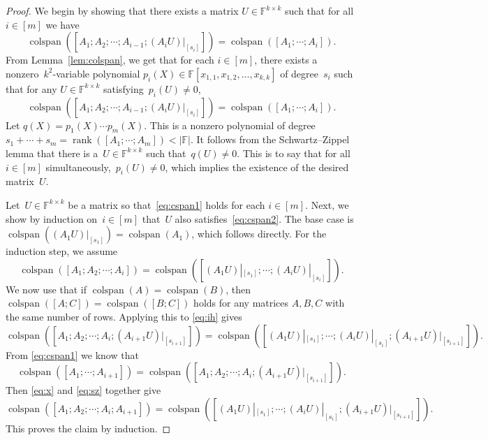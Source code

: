 \documentclass{daj}
\newcommand{\FF}{\mathbb{F}}
\DeclareMathOperator{\rank}{rank} \DeclareMathOperator{\col}{colspan}
\begin{document}
\begin{proof}
We begin by showing that there exists a matrix $U \in \FF^{k \times k}$ such that for all $i \in [m]$ we have 
\begin{equation}\label{eq:cspan1}
    \col([A_1 ; A_2 ; \cdots ; A_{i-1} ; (A_i U)|_{[s_i]}]) = \col([A_1; \cdots ; A_i]).
\end{equation}
From Lemma~\ref{lem:colspan}, we get that for each $i\in [m]$, there exists a nonzero~$k^2$-variable polynomial $p_i(X)\in \FF[x_{1,1},x_{1,2},\dots,x_{k,k}]$ of degree~$s_i$ such that for any $U\in \FF^{k\times k}$ satisfying~$p_i(U)\ne 0$,
\[
    \col([A_1 ; A_2 ; \cdots ; A_{i-1} ; (A_i U)|_{[s_i]}]) = \col([A_1; \cdots ; A_i]).
    \]
Let $q(X)=  p_1(X)\cdots p_m(X)$.
This is a nonzero polynomial of degree $s_1 + \cdots +s_m = \rank([A_1; \cdots; A_m])<|\FF|$.
It follows from the Schwartz--Zippel lemma \cite{DEMILLO1978193, schwartz1980fast, zippel1979probabilistic} that there is a~$U\in \FF^{k\times k}$ such that~$q(U) \ne 0$.
This is to say that for all~$i\in[m]$ simultaneously,~$p_i(U)\ne 0$, which implies the existence of the desired matrix~$U$.

Let~$U\in \FF^{k\times k}$ be a matrix so that~\eqref{eq:cspan1} holds for each $i\in [m]$.
Next, we show by induction on~$i\in[m]$ that~$U$ also satisfies~\eqref{eq:cspan2}.
The base case is $\col((A_1 U)|_{[s_1]}) = \col(A_1)$,
which follows directly.
For the induction step, we assume
\begin{equation}\label{eq:ih}
    \col([A_1 ; A_2 ; \cdots ; A_i]) = \col([(A_1U)|_{[s_1]} ; \cdots ; (A_iU)|_{[s_i]}]).
\end{equation}
We now use that if $\col(A) = \col(B)$, then $\col([A ; C]) = \col([B;C])$ holds for any matrices $A,B,C$ with the same number of rows. Applying this to \eqref{eq:ih} gives
\begin{equation}\label{eq:x}
    \col([A_1 ; A_2 ; \cdots ; A_i; (A_{i+1} U)|_{[s_{i+1}]}]) = \col([(A_1U)|_{[s_1]} ; \cdots ; (A_iU)|_{[s_i]}; (A_{i+1} U)|_{[s_{i+1}]}]).
\end{equation}
From \eqref{eq:cspan1} we know that 
\begin{equation}\label{eq:sz}
    \col([A_1; \cdots ; A_{i+1}]) = \col([A_1 ; A_2 ; \cdots ; A_i ; (A_{i+1} U)|_{[s_{i+1}]}]).
\end{equation}
%
%
Then \eqref{eq:x} and \eqref{eq:sz} together give
    \[
    \col([A_1 ; A_2 ; \cdots ; A_i; A_{i+1}]) = \col([(A_1U)|_{[s_1]} ; \cdots ; (A_iU)|_{[s_i]}; (A_{i+1}U)|_{[s_{i+1}]}]).
    \]
This proves the claim by induction.
\end{proof}
\end{document}

